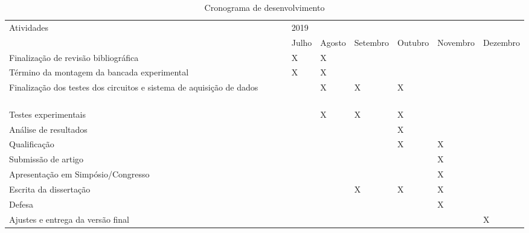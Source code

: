 \documentclass[
	12pt,				
	oneside,			
	a4paper,			
	english,			
	brazil				
	]{abntex2ppgsi}
\begin{document}
\begin{table}
\centering
\caption{Cronograma de desenvolvimento}
\resizebox{\textwidth}{!}
{\begin{tabular}{|l|l|l|l|l|l|l|}

\hline
\multirow{2}{*}{Atividades }                                                  & \multicolumn{6}{l|}{2019}                                  \\ 
\cline{2-7}
                                                                              & Julho & Agosto & Setembro & Outubro & Novembro & Dezembro  \\ 
\hline
Finalização de revisão bibliográfica~ ~ ~ ~ ~                                 & X     & X      &          &         &          &           \\ 
\hline
Término da montagem da bancada experimental~ ~ ~ ~ ~                          & X     & X      &          &         &          &           \\ 
\hline
Finalização dos testes dos circuitos e sistema de aquisição de dados~ ~ ~ ~ ~ &       & X      & X        & X       &          &           \\ 
\hline
Testes experimentais~ ~ ~ ~ ~~                                                &       & X      & X        & X       &          &           \\ 
\hline
Análise de resultados~ ~ ~ ~ ~                                                &       &        &          & X       &          &           \\ 
\hline
Qualificação~ ~ ~ ~ ~                                                         &       &        &          & X       & X        &           \\ 
\hline
Submissão de artigo~ ~ ~ ~ ~                                                  &       &        &          &         & X        &           \\ 
\hline
Apresentação em Simpósio/Congresso~ ~ ~ ~ ~                                   &       &        &          &         & X        &           \\ 
\hline
Escrita da dissertação~ ~ ~ ~ ~                                               &       &        & X        & X       & X        &           \\ 
\hline
Defesa~ ~ ~ ~ ~~                                                              &       &        &          &         & X        &           \\ 
\hline
Ajustes e entrega da versão final~ ~ ~ ~ ~                                    &       &        &          &         &          & X         \\
\hline
\end{tabular}}
\label{tab:ExemploDeTabela1}
\end{table}
\end{document}
